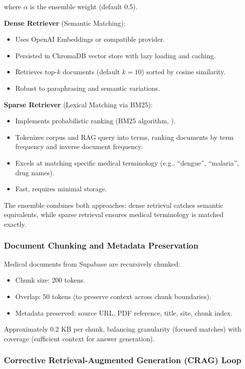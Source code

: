 \documentclass[11pt,a4paper]{article}
\begin{document}
where $\alpha$ is the ensemble weight (default 0.5).

\textbf{Dense Retriever} (Semantic Matching):
\begin{itemize}
    \item Uses OpenAI Embeddings or compatible provider.
    \item Persisted in ChromaDB vector store with lazy loading and caching.
    \item Retrieves top-$k$ documents (default $k=10$) sorted by cosine similarity.
    \item Robust to paraphrasing and semantic variations.
\end{itemize}

\textbf{Sparse Retriever} (Lexical Matching via BM25):
\begin{itemize}
    \item Implements probabilistic ranking (BM25 algorithm, \cite{robertson1994okapi}).
    \item Tokenizes corpus and RAG query into terms, ranking documents by term frequency and inverse document frequency.
    \item Excels at matching specific medical terminology (e.g., ``dengue'', ``malaria'', drug names).
    \item Fast, requires minimal storage.
\end{itemize}

The ensemble combines both approaches: dense retrieval catches semantic equivalents, while sparse retrieval ensures medical terminology is matched exactly.

\subsubsection{Document Chunking and Metadata Preservation}
Medical documents from Supabase are recursively chunked:
\begin{itemize}
    \item Chunk size: 200 tokens.
    \item Overlap: 50 tokens (to preserve context across chunk boundaries).
    \item Metadata preserved: source URL, PDF reference, title, site, chunk index.
\end{itemize}

Approximately 0.2 KB per chunk, balancing granularity (focused matches) with coverage (sufficient context for answer generation).

\subsubsection{Corrective Retrieval-Augmented Generation (CRAG) Loop}
\label{sec:crag-loop}
\end{document}

